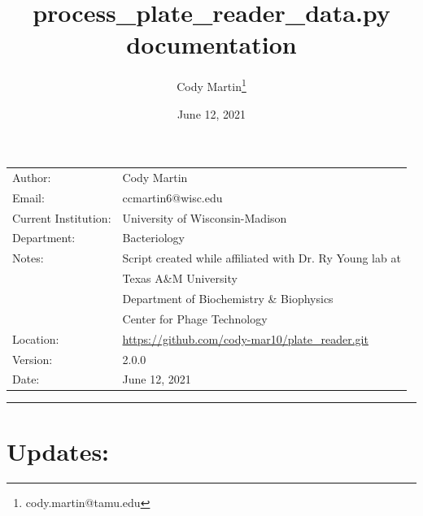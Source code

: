 \documentclass[12pt]{article}
\author{Cody Martin\thanks{cody.martin@tamu.edu}}
\date{June 12, 2021}
\title{process\_plate\_reader\_data.py documentation}
\begin{document}
\maketitle
\begin{center}
\begin{xltabular}{\textwidth}{lX}
\hline
Author: & Cody Martin\\
Email: & ccmartin6@wisc.edu\\
\hline
Current Institution: & University of Wisconsin-Madison\\
Department: & Bacteriology\\
\hline
Notes: & Script created while affiliated with Dr. Ry Young lab at\\
 & Texas A\&M University\\
 & Department of Biochemistry \& Biophysics\\
 & Center for Phage Technology\\
\hline
Location: & \url{https://github.com/cody-mar10/plate\_reader.git}\\
Version: & 2.0.0\\
Date: & June 12, 2021\\
\end{xltabular}
\end{center}

\noindent\rule{\textwidth}{0.5pt}
\section*{Updates:}
\label{sec:orgf170f28}
\end{document}
